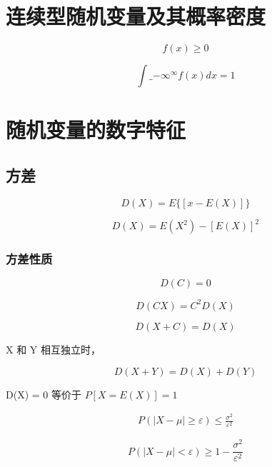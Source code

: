 \section{连续型随机变量及其概率密度}

\begin{equation} f(x) \geq 0 \end{equation}

\begin{equation} \int\_{-\infty}^{\infty} f(x) d x=1 \end{equation}


\section{随机变量的数字特征}

\subsection{方差}


\begin{equation}
 D(X) = E \Big\{ [x-E(X)] \Big\}
\end{equation}

\begin{equation}
 D(X) = E(X^2) - [E(X)] ^2
\end{equation}

\subsubsection{方差性质}

\begin{equation}
 D(C) = 0
\end{equation}

\begin{equation}
 D(CX) = C^2D(X)
\end{equation}

\begin{equation}
 D(X+C) = D(X)
\end{equation}

X 和 Y 相互独立时，

\begin{equation}
 D(X+Y) = D(X)+D(Y)
\end{equation}

D(X) = 0 等价于 $
 P[X = E(X)] = 1
$

\begin{theorem}[切比雪夫不等式]
    \label{Chebyshev\'sInequality}
\begin{equation}
\begin{aligned}
    P(|X-\mu| \ge \varepsilon) \le \frac{\sigma^2}{\varepsilon^2}
\end{aligned}
\end{equation}

\begin{equation}
 P(|X-\mu| < \varepsilon) \ge 1 - \frac{\sigma^2}{\varepsilon^2}
\end{equation}
\end{theorem}

